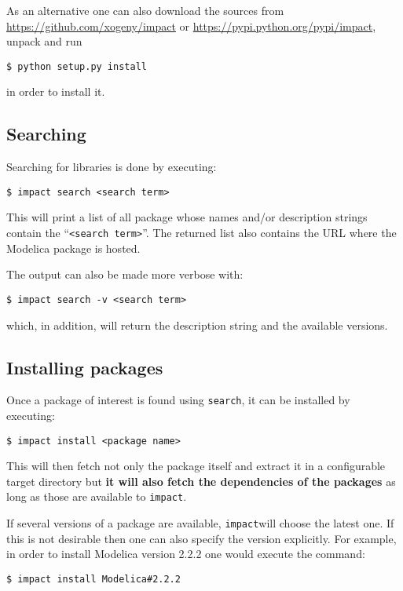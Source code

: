 \documentclass[11pt,a4paper,twocolumn]{article}
\newcommand{\impact}{\texttt{impact}} %
\newcommand{\code}[1]{\texttt{#1}} %
\begin{document}
As an alternative one can also download the sources from
\url{https://github.com/xogeny/impact} or
\url{https://pypi.python.org/pypi/impact},
unpack and run
\begin{verbatim}
$ python setup.py install
\end{verbatim}

in order to install it.

\subsection{Searching} %
\label{cmd:search}

Searching for libraries is done by executing:

\begin{verbatim}
$ impact search <search term>
\end{verbatim}

This will print a list of all package whose names and/or description
strings contain the ``\code{<search term>}''. The returned list also
contains the URL where the Modelica package is hosted.

The output can also be made more verbose with:
\begin{verbatim}
$ impact search -v <search term>
\end{verbatim}
which, in addition, will return the description string and the
available versions.

\subsection{Installing packages} %
\label{cmd:install-pkg}
Once a package of interest is found using \code{search}, it can be
installed by executing:
\begin{verbatim}
$ impact install <package name>
\end{verbatim}
This will then fetch not only the package itself and extract it in a
configurable target directory but \textbf{it will also fetch the
  dependencies of the packages} as long as those are available to
\impact.

If several versions of a package are available, \impact will choose
the latest one. If this is not desirable then one can also specify the
version explicitly. For example, in order to install Modelica version
2.2.2 one would execute the command:
\begin{verbatim}
$ impact install Modelica#2.2.2
\end{verbatim}
\end{document}
